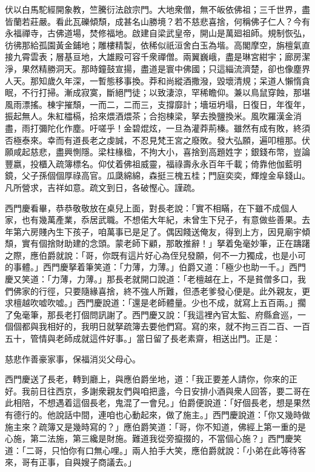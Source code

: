 \begin{myquote}[\markfont]
伏以白馬駝經開象教，竺騰衍法啟宗門。大地衆僧，無不皈依佛祖；三千世界，盡皆蘭若莊嚴。看此瓦礫傾頹，成甚名山勝境？若不慈悲喜捨，何稱佛子仁人？今有永福禪寺，古佛道場，焚修福地。啟建自梁武皇帝，開山是萬廻祖師。規制恢弘，彷彿那給孤園黃金鋪地；雕樓精製，依稀似祇洹舍白玉為堦。高閣摩空，旃檀氣直接九霄雲表；層基亘地，大雄殿可容千衆禪僧。兩翼巍峨，盡是琳宮紺宇；廊房潔淨，果然精勝洞天。那時鐘鼓宣揚，盡道是寰中佛國；只這緇流濟楚，卻也像塵界人天。那知歲久年深，一暫態移事換。莽和尚縱酒撒潑，毀壞清規；呆道人懶惰貪眠，不行打掃。{}漸成寂寞，斷絕門徒；以致淒涼，罕稀瞻仰。兼以鳥鼠穿蝕，那堪風雨漂搖。棟宇摧頹，一而二，二而三，支撐靡計；墻垣坍塌，日復日，年復年，振起無人。朱紅櫺槅，拾來煨酒煨茶；合抱棟梁，拏去換鹽換米。風吹羅漢金消盡，雨打彌陀化作塵。吁嗟乎！金碧焜炫，一旦為灌莽荊榛。雖然有成有敗，終須否極泰來。幸而有道長老之虔誠，不忍見梵王宮之廢敗。發大弘願，遍叩檀那。伏願咸起慈悲，盡興惻隱。梁柱椽楹，不拘大小，喜捨到高題姓字；銀錢布幣，豈論豐嬴，投櫃入疏簿標名。仰仗着佛祖威靈，福祿壽永永百年千載；倚靠他伽藍明鏡，父子孫個個厚祿高官。瓜瓞綿綿，森挺三槐五桂；門庭奕奕，輝煌金阜錢山。凡所營求，吉祥如意。疏文到日，各破慳心。謹疏。
\end{myquote}

西門慶看畢，恭恭敬敬放在桌兒上面，對長老說：「實不相瞞，在下雖不成個人家，也有幾萬產業，{}忝居武職。不想偌大年紀，未曾生下兒子，有意做些善果。去年第六房賤內生下孩子，咱萬事已是足了。偶因餞送俺友，得到上方，因見廟宇傾頹，實有個捨財助建的念頭。蒙老師下顧，那敢推辭！」拏着兔毫妙筆，正在躊躇之際，應伯爵就說：「哥，你既有這片好心為侄兒發願，何不一力獨成，{}也是小可的事體。」西門慶拏着筆笑道：「力薄，力薄。」伯爵又道：「極少也助一千。」西門慶又笑道：「力薄，力薄。」那長老就開口說道：「老檀越在上，不是貧僧多口，我們佛家的行徑，只要隨緣喜捨，終不強人所難，但憑老爹發心便是。此外親友，更求檀越吹嘘吹嘘。」西門慶說道：「還是老師體量。少也不成，就寫上五百兩。」擱了兔毫筆，那長老打個問訊謝了。西門慶又說：「我這裡內官太監、府縣倉巡，一個個都與我相好的，我明日就拏疏簿去要他們寫。寫的來，就不拘三百二百、一百五十，管情與老師成就這件好事。」當日留了長老素齋，相送出門。正是：

\begin{myquote}
慈悲作善豪家事，保福消災父母心。
\end{myquote}

西門慶送了長老，轉到廳上，與應伯爵坐地，道：「我正要差人請你，你來的正好。我前日往西京，多謝衆親友們與咱把盞，今日安排小酒與衆人回答，要二哥在此相陪，不想遇着這個長老，鬼混了一會兒。」伯爵便說道：「好個長老，想是果然有德行的。他說話中間，連咱也心動起來，做了施主。」西門慶說道：「你又幾時做施主來？疏簿又是幾時寫的？」{}應伯爵笑道：「哥，你不知道，佛經上第一重的是心施，第二法施，第三纔是財施。難道我從旁攛掇的，不當個心施？」{}西門慶笑道：「二哥，只怕你有口無心哩。」兩人拍手大笑，應伯爵就說：「小弟在此等待客來，哥有正事，自與嫂子商議去。」

